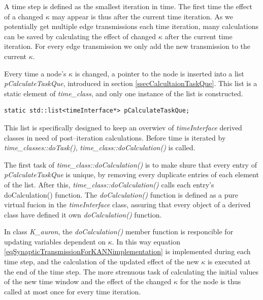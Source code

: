 			A time step is defined as the smallest iteration in time.
			The first time the effect of a changed $\kappa$ may appear is thus after the current time iteration.
			As we potentially get multiple edge transmissions each time iteration, many calculations can be saved by calculating the effect of changed $\kappa$ after the current time iteration.
			For every edge transmission we only add the new transmission to the current $\kappa$.

			Every time a node's $\kappa$ is changed, a pointer to the node is inserted into a list \emph{pCalculateTaskQue}, introduced in section \ref{ssecCalcultaionTaskQue}.
			This list is a static element of \emph{time\_class}, and only one instance of the list is constructed. 
\begin{lstlisting}
static std::list<timeInterface*> pCalculateTaskQue;
\end{lstlisting}
			This list is specifically designed to keep an overwiev of \emph{timeInterface} derived classes in need of post--iteration calculations. %
			Before time is iterated by \emph{time\_classes::doTask()}, \emph{time\_class::doCalculation()} is called.

			The first task of \emph{time\_class::doCalculation()} is to make shure that every entry of \emph{pCalculateTaskQue} is unique, by removing every duplicate entries of each element of the list.
			After this, \emph{time\_class::doCalculation()} calls each entry's doCalculation() function.
			The \emph{doCalculation()} function is defined as a pure virtual fucion in the \emph{timeInterface} class, assuring that every object of a derived class have defined it own \emph{doCalculation()} function.
		
			In class \emph{K\_auron},  the \emph{doCalculation()} member function is responcible for updating variables dependent on $\kappa$.
			In this way equation \eqref{eqSynapticTransmissionForKANNimplementation} is implemented during each time step, and the calculation of the updated effect of the new $\kappa$ is executed at the end of the time step.
			The more strenuous task of calculating the initial values of the new time window and the effect of the changed $\kappa$ for the node is thus called at most once for every time iteration.

